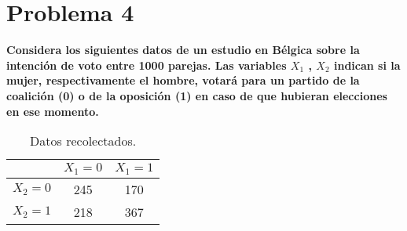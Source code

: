 \section*{Problema 4}

\textbf{Considera los siguientes datos de un estudio en Bélgica sobre la intención de voto entre 1000 parejas. Las variables $X_1$ , $X_2$ indican si la mujer, respectivamente el hombre, votará para un partido de la coalición (0) o de la oposición (1) en caso de que hubieran elecciones en ese momento.}

\begin{table}[H]
	\centering
	\begin{tabular}{c|cc}
		        & $X_1=0$ & $X_1=1$ \\  \hline
		$X_2=0$ & 245     & 170     \\
		$X_2=1$ & 218     & 367
	\end{tabular}
	\caption{Datos recolectados.}
	\label{table:problema04}
\end{table}

